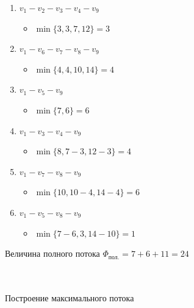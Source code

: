 \documentclass[14pt]{extarticle}
\begin{document}
\begin{enumerate} 
	\setlength{\itemindent}{3mm}
	\item $v_1 - v_2 - v_3 - v_4 - v_9$
	\begin{itemize}
		\setlength{\itemindent}{3mm}
		\item $\min\{3, 3, 7, 12\} = 3$
	\end{itemize}
	\item $v_1 - v_6 - v_7 - v_8 - v_9$
	\begin{itemize}
		\setlength{\itemindent}{3mm}
		\item $\min\{4, 4,10, 14\} = 4$
	\end{itemize}
	\item $v_1 - v_5 - v_9$
	\begin{itemize}
		\setlength{\itemindent}{3mm}
		\item $\min\{7, 6\} = 6$
	\end{itemize}
	\item $v_1 - v_3 - v_4 - v_9$
	\begin{itemize}
		\setlength{\itemindent}{3mm}
		\item $\min\{8, 7-3, 12-3\} = 4$
	\end{itemize}
	\item $v_1 - v_7 - v_8 - v_9$
	\begin{itemize}
		\setlength{\itemindent}{3mm}
		\item $\min\{10, 10-4, 14-4\} = 6$
	\end{itemize}
	\item $v_1 - v_5 - v_8 - v_9$
	\begin{itemize}
		\setlength{\itemindent}{3mm}
		\item $\min\{7-6, 3, 14-10\} = 1$
	\end{itemize}
\end{enumerate}
\par
Величина полного потока $\Phi_{\text{пол.}} = 7 + 6 + 11 = 24$\\\\\
\par
Построение максимального потока\\
\vspace{5mm}
\end{document}
